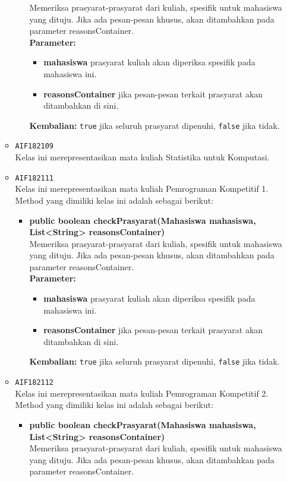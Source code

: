 \begin{enumerate}
\begin{itemize}
\begin{itemize}
Memeriksa prasyarat-prasyarat dari kuliah, spesifik untuk mahasiswa yang dituju. Jika ada pesan-pesan khusus, akan ditambahkan pada parameter reasonsContainer.\\
\textbf{Parameter:}
\begin{itemize}
\item \textbf{mahasiswa} prasyarat kuliah akan diperiksa spesifik pada mahasiswa ini.
\item \textbf{reasonsContainer} jika pesan-pesan terkait prasyarat akan ditambahkan di sini.
\end{itemize}
\textbf{Kembalian:} \texttt{true} jika seluruh prasyarat dipenuhi, \texttt{false} jika tidak.
\end{itemize}
\item \texttt{AIF182109} \\
Kelas ini merepresentasikan mata kuliah Statistika untuk Komputasi.
\item \texttt{AIF182111} \\
Kelas ini merepresentasikan mata kuliah Pemrograman Kompetitif 1. Method yang dimiliki kelas ini adalah sebagai berikut: 
\begin{itemize}
\item \textbf{public boolean checkPrasyarat(Mahasiswa mahasiswa, List<String> reasonsContainer)}\\
Memeriksa prasyarat-prasyarat dari kuliah, spesifik untuk mahasiswa yang dituju. Jika ada pesan-pesan khusus, akan ditambahkan pada parameter reasonsContainer.\\
\textbf{Parameter:}
\begin{itemize}
\item \textbf{mahasiswa} prasyarat kuliah akan diperiksa spesifik pada mahasiswa ini.
\item \textbf{reasonsContainer} jika pesan-pesan terkait prasyarat akan ditambahkan di sini.
\end{itemize}
\textbf{Kembalian:} \texttt{true} jika seluruh prasyarat dipenuhi, \texttt{false} jika tidak.
\end{itemize}
\item \texttt{AIF182112} \\
Kelas ini merepresentasikan mata kuliah Pemrograman Kompetitif 2. Method yang dimiliki kelas ini adalah sebagai berikut: 
\begin{itemize}
\item \textbf{public boolean checkPrasyarat(Mahasiswa mahasiswa, List<String> reasonsContainer)}\\
Memeriksa prasyarat-prasyarat dari kuliah, spesifik untuk mahasiswa yang dituju. Jika ada pesan-pesan khusus, akan ditambahkan pada parameter reasonsContainer.\\

\end{itemize}
\end{itemize}
\end{enumerate}
